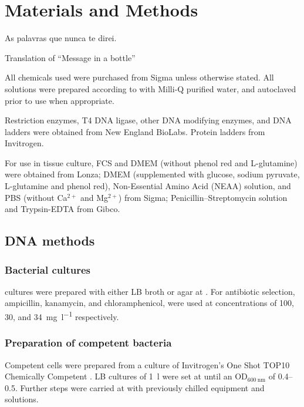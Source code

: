 \chapter{Materials and Methods}
\label{ch:methods}

\epigraph{As palavras que nunca te direi.}{Translation of ``Message in a bottle''}
\noindent

All chemicals used were purchased from Sigma unless otherwise stated. All solutions were prepared
according to  with Milli-Q purified water, and autoclaved prior to use when appropriate.

Restriction enzymes, T4 DNA ligase, other DNA modifying enzymes, and DNA ladders were obtained
from New England BioLabs. Protein ladders from Invitrogen.

For use in tissue culture, FCS and DMEM (without phenol red and L-glutamine) were obtained from Lonza;
DMEM (supplemented with glucose, sodium pyruvate, L-glutamine and phenol red), Non-Essential Amino Acid
(NEAA) solution, and PBS (without Ca$^{2+}$ and Mg$^{2+}$) from Sigma; Penicillin--Streptomycin solution
and Trypsin-EDTA from Gibco.

\section{DNA methods}
  \subsection{Bacterial cultures}
     cultures were prepared with either LB broth or agar at . For antibiotic
    selection, ampicillin, kanamycin, and chloramphenicol, were used at concentrations of 100, 30,
    and \SI{34}{\mg\per\l} respectively.

  \subsection{Preparation of competent bacteria}
    Competent  cells were prepared from a culture of Invitrogen's One Shot
    TOP10 Chemically Competent . LB cultures of \SI{1}{\l} were set at
     until an OD$_{\SI{600}{\nm}}$ of \numrange{0.4}{0.5}. Further steps were carried
    at  with previously chilled equipment and solutions.
    
